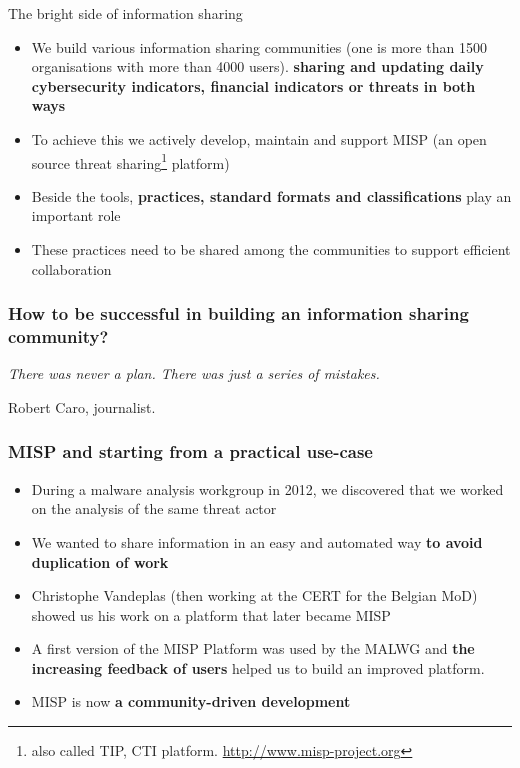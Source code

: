 
\begin{frame}[t,plain]
\titlepage
\end{frame}

\begin{frame}{The bright side of information sharing}
\begin{itemize}
        \item We build various information sharing communities (one is more than 1500 organisations with more than 4000 users). {\bf sharing and updating daily cybersecurity indicators, financial indicators or threats in both ways}
        \item To achieve this we actively develop, maintain and support MISP (an open source threat sharing\footnote{also called TIP, CTI platform. \url{http://www.misp-project.org}} platform)
        \item Beside the tools, {\bf practices, standard formats and classifications} play an important role
        \item These practices need to be shared among the communities to support efficient collaboration
\end{itemize}
\end{frame}

\begin{frame}
\frametitle{How to be successful in building an information sharing community?}
        {\center \it \Huge There was never a plan. There was just a series of mistakes.\\}
        \begin{flushright}
        Robert Caro, journalist.
        \end{flushright}
\end{frame}


\begin{frame}
 \frametitle{MISP and starting from a practical use-case}
 \begin{itemize}
         \item During a malware analysis workgroup in 2012, we discovered that we worked on the analysis of the same threat actor
         \item We wanted to share information in an easy and automated way {\bf to avoid duplication of work}
         \item Christophe Vandeplas (then working at the CERT for the Belgian MoD) showed us his work on a platform that later became MISP
         \item A first version of the MISP Platform was used by the MALWG and {\bf the increasing feedback of users} helped us to build an improved platform.
         \item MISP is now {\bf a community-driven development}
 \end{itemize}
\end{frame}

